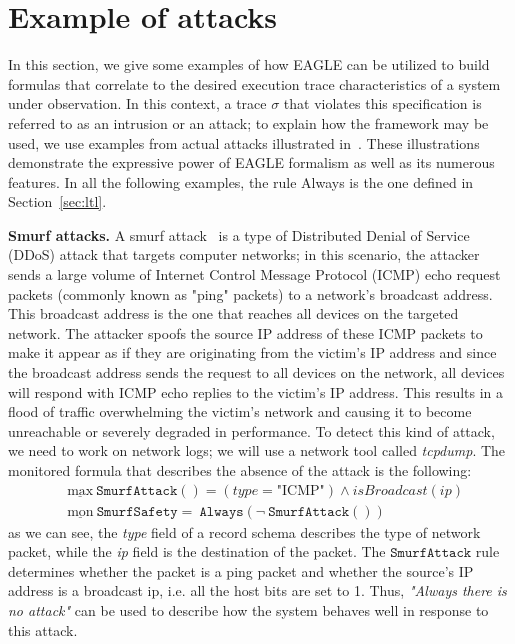 \documentclass[english]{article}
\begin{document}
\section{Example of attacks}\label{attacks}
In this section, we give some examples of how EAGLE can be utilized to build formulas that correlate to the desired execution trace characteristics of a system under observation. In this context, a trace $\sigma$ that violates this specification is referred to as an intrusion or an attack; to explain how the framework may be used, we use examples from actual attacks illustrated in~\cite{naldurg2004temporal}. These illustrations demonstrate the expressive power of EAGLE formalism as well as its numerous features. In all the following examples, the rule Always is the one defined in Section~\ref{sec:ltl}.

\textbf{Smurf attacks.}
A smurf attack~\cite{zargar2009identification} is a type of Distributed Denial of Service (DDoS) attack that targets computer networks; in this scenario, the attacker sends a large volume of Internet Control Message Protocol (ICMP) echo request packets (commonly known as "ping" packets) to a network's broadcast address. This broadcast address is the one that reaches all devices on the targeted network. The attacker spoofs the source IP address of these ICMP packets to make it appear as if they are originating from the victim's IP address and since the broadcast address sends the request to all devices on the network, all devices will respond with ICMP echo replies to the victim's IP address. This results in a flood of traffic overwhelming the victim's network and causing it to become unreachable or severely degraded in performance. To detect this kind of attack, we need to work on network logs; we will use a network tool called \textit{tcpdump}. The monitored formula that describes the absence of the attack is the following:
\begin{align*}
    & \underline{\text{max}}\ \mathtt{SmurfAttack()} = (type = \text{"ICMP"})\land isBroadcast(ip) \\
    & \underline{\text{mon}}\ \mathtt{SmurfSafety} =\ \mathtt{Always}(\neg\ \mathtt{SmurfAttack()}) 
\end{align*}
as we can see, the \textit{type} field of a record schema describes the type of network packet, while the \textit{ip} field is the destination of the packet. The $\mathtt{SmurfAttack}$ rule determines whether the packet is a ping packet and whether the source's IP address is a broadcast ip, i.e. all the host bits are set to 1. Thus, \textit{"Always there is no attack"} can be used to describe how the system behaves well in response to this attack.
\end{document}
